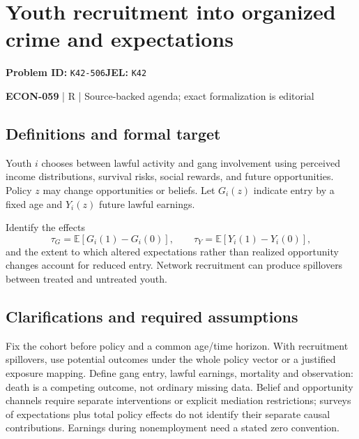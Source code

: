 \documentclass[11pt,a4paper]{article}
\begin{document}
\section*{Youth recruitment into organized crime and expectations}
\textbf{Problem ID:} \texttt{K42-506}\quad \textbf{JEL:} \texttt{K42}\par
\label{problem:OP-0628}


\label{audited:ECON-059}

{\sffamily\small\color{muted}\textbf{ECON-059} | R | Source-backed agenda; exact formalization is editorial\par}

\subsection*{Definitions and formal target}

Youth $i$ chooses between lawful activity and gang involvement using perceived income distributions, survival risks, social rewards, and future opportunities. Policy $z$ may change opportunities or beliefs. Let $G_i(z)$ indicate entry by a fixed age and $Y_i(z)$ future lawful earnings.

Identify the effects
\[
 \tau_G=\mathbb E[G_i(1)-G_i(0)],\qquad
 \tau_Y=\mathbb E[Y_i(1)-Y_i(0)],
\]
and the extent to which altered expectations rather than realized opportunity changes account for reduced entry. Network recruitment can produce spillovers between treated and untreated youth.

\subsection*{Clarifications and required assumptions}

Fix the cohort before policy and a common age/time horizon. With recruitment spillovers, use potential outcomes under the whole policy vector or a justified exposure mapping. Define gang entry, lawful earnings, mortality and observation: death is a competing outcome, not ordinary missing data. Belief and opportunity channels require separate interventions or explicit mediation restrictions; surveys of expectations plus total policy effects do not identify their separate causal contributions. Earnings during nonemployment need a stated zero convention.
\end{document}

